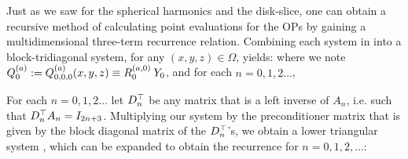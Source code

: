Just as we saw for the spherical harmonics and the disk-slice, one can obtain a recursive method of calculating point evaluations for the OPs by gaining a multidimensional three-term recurrence relation. Combining each system in  into a block-tridiagonal system, for any $(x,y,z) \in \Omega$, yields:
where we note $Q^{(a)}_0 := Q^{(a)}_{0,0,0}(x,y,z) \equiv R_0^{(a,0)} \: Y_0$, and for each $n = 0,1,2\dots$,
 
For each $n = 0,1,2\dots$ let $D^\top_n$ be any matrix that is a left inverse of $A_n$, i.e. such that $D^\top_n A_n = I_{2n+3}$. Multiplying our system by the preconditioner matrix that is given by the block diagonal matrix of the $D^\top_n$'s, we obtain a lower triangular system \cite[p78]{dunkl2014orthogonal}, which can be expanded to obtain the recurrence for $n = 0,1,2,\dots$:

